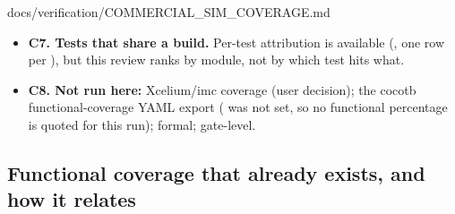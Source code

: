 \begin{relocated}{docs/verification/COMMERCIAL_SIM_COVERAGE.md}
\begin{itemize}
  \textbf{C6. \texttt{-\allowbreak{}flex\_\allowbreak{}merge\ modules}
  is LCA} and the merged  is written next to the report
  directory (). Instance-level hierarchies of
  different testbenches are reported side by side, not merged.
\item
  \textbf{C7. Tests that share a build.} Per-test attribution is
  available (, one row per ), but this
  review ranks by module, not by which test hits what.
\item
  \textbf{C8. Not run here:} Xcelium/\allowbreak{}imc coverage (user
  decision); the cocotb functional-coverage YAML export
  ( was not set, so no functional percentage is
  quoted for this run); formal; gate-level.
\end{itemize}

\subsection{Functional coverage that already exists, and how it
relates}\label{tm:flow:commercial-sim-coverage:7-functional-coverage-that-already-exists-and-how-it-relates}

{\footnotesize\setlength{\tabcolsep}{3pt}

}
\end{relocated}
